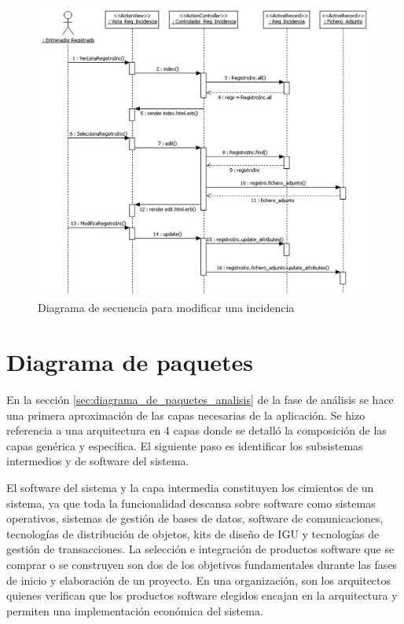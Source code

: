 		  \begin{figure}[H]
			  \centering
			    \includegraphics[width=15cm]{./eps/di_diagsecuencia/RegistroInc_Modificar.eps}
			  \caption{Diagrama de secuencia para modificar una incidencia}
			  \label{fig:di_sec_modificarincidencia}
			\end{figure}
			

	\section{Diagrama de paquetes} %
		\label{sec:diagrama_de_paquetes_diseno}
	
		En la sección \ref{sec:diagrama_de_paquetes_analisis} de la fase de análisis se hace una primera aproximación de las capas necesarias de la aplicación. Se hizo referencia a una arquitectura en 4 capas donde se detalló la composición de las capas genérica y específica. El siguiente paso es identificar los subsistemas intermedios y de software del sistema.
		
		El software del sistema y la capa intermedia constituyen los cimientos de un sistema, ya que toda la funcionalidad descansa sobre software como sistemas operativos, sistemas de gestión de bases de datos, software de comunicaciones, tecnologías de distribución de objetos, kits de diseño de IGU y tecnologías de gestión de transacciones. La selección e integración de productos software que se comprar o se construyen son dos de los objetivos fundamentales durante las fases de inicio y elaboración de un proyecto. En una organización, son los arquitectos quienes verifican que los productos software elegidos encajan en la arquitectura y permiten una implementación económica del sistema. 
		

